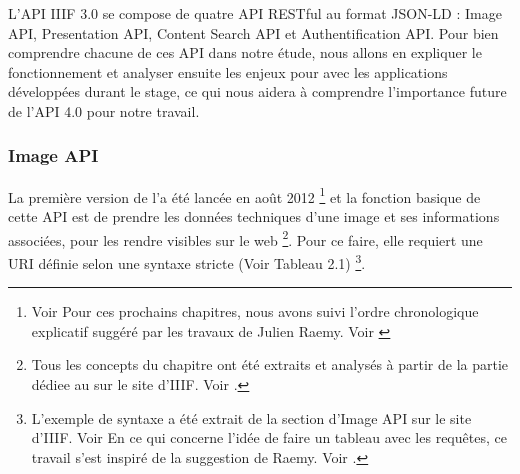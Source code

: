     L'API IIIF 3.0 se compose de quatre API RESTful au format JSON-LD : Image API, Presentation API, Content Search API et Authentification API. Pour bien comprendre chacune de ces API dans notre étude, nous allons en expliquer le fonctionnement et analyser ensuite les enjeux pour \dsc avec les applications développées durant le stage, ce qui nous aidera à comprendre l'importance future de l'API 4.0 pour notre travail.
    

    \subsubsection{Image API}
    
    La première version de l'\iapit a été lancée en août 2012 \footnote{Voir Pour ces prochains chapitres, nous avons suivi l'ordre chronologique explicatif suggéré par les travaux de Julien Raemy. Voir \cite{raemy2017iiif}} et la fonction basique de cette API est de prendre les données techniques d'une image et ses informations associées, pour les rendre visibles sur le web \footnote{Tous les concepts du chapitre ont été extraits et analysés à partir de la partie dédiee au \iapit sur le site d'IIIF. Voir \cite{iiifimage30}.}. Pour ce faire, elle requiert une URI définie selon une syntaxe stricte (Voir Tableau 2.1) \footnote{L'exemple de syntaxe a été extrait de la section d'Image API sur le site d'IIIF. Voir \cite{iiifimage30} En ce qui concerne l'idée de faire un tableau avec les requêtes, ce travail s'est inspiré de la suggestion de Raemy. Voir \cite[p.~20]{raemy2017iiif}.}.
    
        \begin{table}[h!]
        \centering
        \caption{Structure des requêtes d'image et d'information}
        \end{table}

